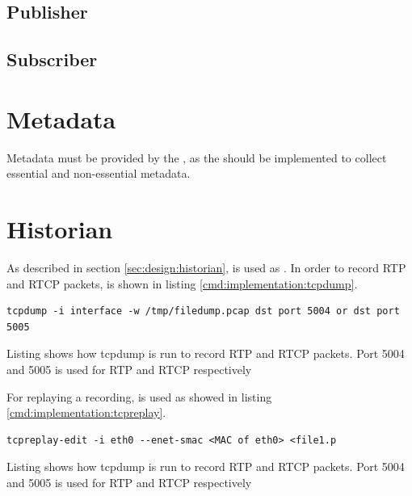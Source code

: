 \subsection{Publisher}
\subsection{Subscriber}


\section{Metadata}
Metadata must be provided by the \pro{}, as the \pro{} should be implemented to collect essential and non-essential metadata.


\section{Historian}
As described in section \ref{sec:design:historian},  is used as \hist{}.
In order to record RTP and RTCP packets,  is shown in listing \ref{cmd:implementation:tcpdump}.
\begin{listing}[h] 
\begin{verbatim}
tcpdump -i interface -w /tmp/filedump.pcap dst port 5004 or dst port 5005 
\end{verbatim}
\caption{Listing shows how tcpdump is run to record RTP and RTCP packets. Port 5004 and 5005 is used for RTP and RTCP respectively}
\label{cmd:implementation:tcpdump}
\end{listing}


For replaying a recording,  is used as showed in listing \ref{cmd:implementation:tcpreplay}.
\begin{listing}[h] 
	\begin{verbatim}
tcpreplay-edit -i eth0 --enet-smac <MAC of eth0> <file1.p
	\end{verbatim}
\caption{Listing shows how tcpdump is run to record RTP and RTCP packets. Port 5004 and 5005 is used for RTP and RTCP respectively}
\label{cmd:implementation:tcpreplay}
\end{listing}


